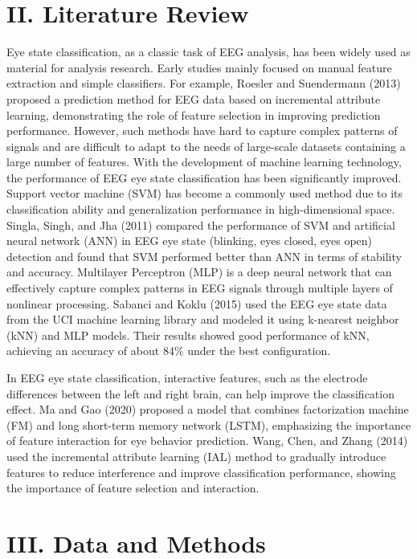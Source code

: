 \documentclass[
  doc]{apa6}
\begin{document}
\section{II. Literature Review}\label{ii.-literature-review}

Eye state classification, as a classic task of EEG analysis, has been widely used as material for analysis research. Early studies mainly focused on manual feature extraction and simple classifiers. For example, Roesler and Suendermann (2013) proposed a prediction method for EEG data based on incremental attribute learning, demonstrating the role of feature selection in improving prediction performance. However, such methods have hard to capture complex patterns of signals and are difficult to adapt to the needs of large-scale datasets containing a large number of features. With the development of machine learning technology, the performance of EEG eye state classification has been significantly improved. Support vector machine (SVM) has become a commonly used method due to its classification ability and generalization performance in high-dimensional space. Singla, Singh, and Jha (2011) compared the performance of SVM and artificial neural network (ANN) in EEG eye state (blinking, eyes closed, eyes open) detection and found that SVM performed better than ANN in terms of stability and accuracy. Multilayer Perceptron (MLP) is a deep neural network that can effectively capture complex patterns in EEG signals through multiple layers of nonlinear processing. Sabanci and Koklu (2015) used the EEG eye state data from the UCI machine learning library and modeled it using k-nearest neighbor (kNN) and MLP models. Their results showed good performance of kNN, achieving an accuracy of about 84\% under the best configuration.

In EEG eye state classification, interactive features, such as the electrode differences between the left and right brain, can help improve the classification effect. Ma and Gao (2020) proposed a model that combines factorization machine (FM) and long short-term memory network (LSTM), emphasizing the importance of feature interaction for eye behavior prediction. Wang, Chen, and Zhang (2014) used the incremental attribute learning (IAL) method to gradually introduce features to reduce interference and improve classification performance, showing the importance of feature selection and interaction.

\section{III. Data and Methods}\label{iii.-data-and-methods}
\end{document}
